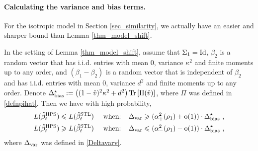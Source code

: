   
\paragraph{Calculating the variance and bias terms.} For the isotropic model in Section \ref{sec_similarity}, we actually have an easier and sharper bound than Lemma \ref{thm_model_shift}. %
\begin{lemma}\label{prop_model_shift_tight}
		In the setting of Lemma \ref{thm_model_shift}, assume that $\Sigma_1 =\operatorname{Id}$,
		$\beta_2$ is a random vector that has i.i.d. entries with mean $0$, variance $\kappa^2$ and finite moments up to any order, and $(\beta_1-\beta_2)$ is a random vector that is independent of $\beta_2$ and has i.i.d. entries with mean $0$, variance $d^2$ and finite moments up to any order. Denote
		$\Delta^\star_{\text{bias}} := \left({(1 - \hat{v})^2 \kappa^2 + d^2}\right) \operatorname{Tr}\left[\Pi(\hat v)\right]$, where $\Pi$ was defined in \eqref{defnpihat}.	Then we have with high probability,
		\begin{align*}
			L(\hat{\beta}_t^{\textup{HPS}}) \leqslant L(\hat{\beta}_t^{\textup{STL}})\quad \text{ when: }\ \  & \Delta_{\text{var}} \geqslant  (\alpha_+^2(\rho_1)+\operatorname{o}(1))\cdot  \Delta^\star_{\text{bias}} \ , \\
			L(\hat{\beta}_t^{\textup{HPS}}) \geqslant L(\hat{\beta}_t^{\textup{STL}})\quad \text{ when: }\ \  & \Delta_{\text{var}} \leqslant (\alpha_-^2(\rho_1)-\operatorname{o}(1))\cdot  \Delta^\star_{\text{bias}}\ ,
		\end{align*}
		where $\Delta_{\text{var}}$ was defined in \eqref{Deltavarv}.
\end{lemma}

